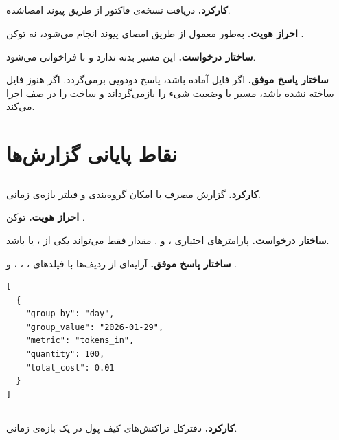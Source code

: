 
\subsection{}
\textbf{کارکرد.} دریافت نسخه‌ی  فاکتور از طریق پیوند امضاشده.

\textbf{احراز هویت.} به‌طور معمول از طریق امضای پیوند انجام می‌شود، نه
توکن .

\textbf{ساختار درخواست.} این مسیر بدنه ندارد و با  فراخوانی
می‌شود.

\textbf{ساختار پاسخ موفق.} اگر فایل آماده باشد، پاسخ دودویی 
برمی‌گردد. اگر هنوز فایل ساخته نشده باشد، مسیر با وضعیت  شیء
 را بازمی‌گرداند و ساخت  را در
صف اجرا می‌کند.

\section{نقاط پایانی گزارش‌ها}

\subsection{}
\textbf{کارکرد.} گزارش مصرف با امکان گروه‌بندی و فیلتر بازه‌ی زمانی.

\textbf{احراز هویت.} توکن .

\textbf{ساختار درخواست.} پارامترهای اختیاری ،  و
. مقدار  فقط می‌تواند یکی از
،  یا  باشد.

\textbf{ساختار پاسخ موفق.} آرایه‌ای از ردیف‌ها با فیلدهای ،
، ،  و .

\begin{latin}
\begin{lstlisting}[style=jsonStyle]
[
  {
    "group_by": "day",
    "group_value": "2026-01-29",
    "metric": "tokens_in",
    "quantity": 100,
    "total_cost": 0.01
  }
]
\end{lstlisting}
\end{latin}


\subsection{}
\textbf{کارکرد.} دفترکل تراکنش‌های کیف پول در یک بازه‌ی زمانی.

